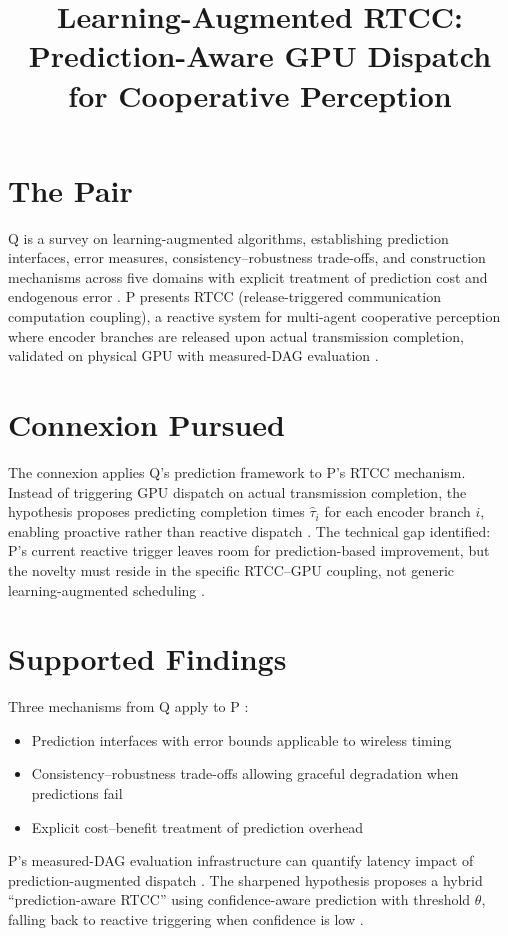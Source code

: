 \documentclass{article}
\title{Learning-Augmented RTCC: Prediction-Aware GPU Dispatch for Cooperative Perception}
\begin{document}
\maketitle

\section*{The Pair}

Q is a survey on learning-augmented algorithms, establishing prediction interfaces, error measures, consistency--robustness trade-offs, and construction mechanisms across five domains with explicit treatment of prediction cost and endogenous error . P presents RTCC (release-triggered communication computation coupling), a reactive system for multi-agent cooperative perception where encoder branches are released upon actual transmission completion, validated on physical GPU with measured-DAG evaluation .

\section*{Connexion Pursued}

The connexion applies Q's prediction framework to P's RTCC mechanism. Instead of triggering GPU dispatch on actual transmission completion, the hypothesis proposes predicting completion times $\hat{\tau}_i$ for each encoder branch $i$, enabling proactive rather than reactive dispatch . The technical gap identified: P's current reactive trigger leaves room for prediction-based improvement, but the novelty must reside in the specific RTCC--GPU coupling, not generic learning-augmented scheduling .

\section*{Supported Findings}

Three mechanisms from Q apply to P :
\begin{itemize}
    \item Prediction interfaces with error bounds applicable to wireless timing
    \item Consistency--robustness trade-offs allowing graceful degradation when predictions fail
    \item Explicit cost--benefit treatment of prediction overhead
\end{itemize}

P's measured-DAG evaluation infrastructure can quantify latency impact of prediction-augmented dispatch . The sharpened hypothesis proposes a hybrid ``prediction-aware RTCC'' using confidence-aware prediction with threshold $\theta$, falling back to reactive triggering when confidence is low .
\end{document}
